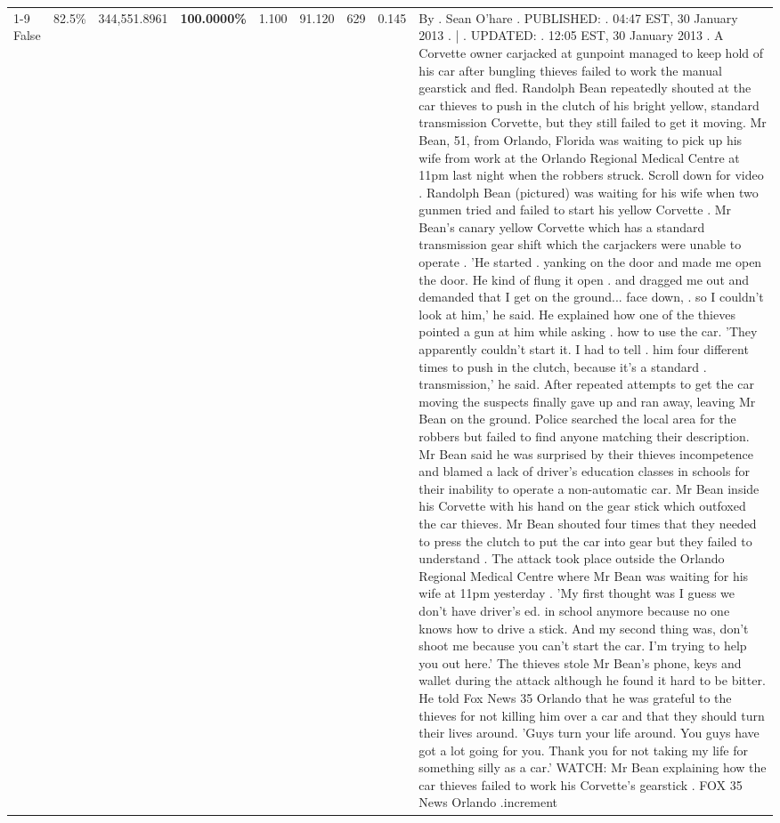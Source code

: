 \begin{table}[H]
\begin{tabular}{lllrlllll}
\cline{1-9} \cline{2-9}
False & 82.5\% & 344,551.8961 & \bfseries \color{red} 100.0000\% & 1.100 & 91.120 & 629 & 0.145 & By . Sean O'hare . PUBLISHED: . 04:47 EST, 30 January 2013 . | . UPDATED: . 12:05 EST, 30 January 2013 . A Corvette owner carjacked at gunpoint managed to keep hold of his car after bungling thieves failed to work the manual gearstick and fled. Randolph Bean repeatedly shouted at the car thieves to push in the clutch of his bright yellow, standard transmission Corvette, but they still failed to get it moving. Mr Bean, 51, from Orlando, Florida was waiting to pick up his wife from work at the Orlando Regional Medical Centre at 11pm last night when the robbers struck. Scroll down for video . Randolph Bean (pictured) was waiting for his wife when two gunmen tried and failed to start his yellow Corvette . Mr Bean's canary yellow Corvette which has a standard transmission gear shift which the carjackers were unable to operate . 'He started . yanking on the door and made me open the door. He kind of flung it open . and dragged me out and demanded that I get on the ground... face down, . so I couldn't look at him,' he said. He explained how one of the thieves pointed a gun at him while asking . how to use the car. 'They apparently couldn't start it. I had to tell . him four different times to push in the clutch, because it's a standard . transmission,' he said. After repeated attempts to get the car moving the suspects finally gave up and ran away, leaving Mr Bean on the ground. Police searched the local area for the robbers but failed to find anyone matching their description. Mr Bean said he was surprised by their thieves incompetence and blamed a lack of driver's education classes in schools for their inability to operate a non-automatic car. Mr Bean inside his Corvette with his hand on the gear stick which outfoxed the car thieves. Mr Bean shouted four times that they needed to press the clutch to put the car into gear but they failed to understand . The attack took place outside the Orlando Regional Medical Centre where Mr Bean was waiting for his wife at 11pm yesterday . 'My first thought was I guess we don't have driver's ed. in school anymore because no one knows how to drive a stick. And my second thing was, don't shoot me because you can't start the car. I'm trying to help you out here.' The thieves stole Mr Bean's phone, keys and wallet during the attack although he found it hard to be bitter. He told Fox News 35 Orlando that he was grateful to the thieves for not killing him over a car and that they should turn their lives around. 'Guys turn your life around. You guys have got a lot going for you. Thank you for not taking my life for something silly as a car.' WATCH: Mr Bean explaining how the car thieves failed to work his Corvette's gearstick . FOX 35 News Orlando .increment \\

\end{tabular}
\end{table}
